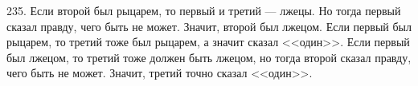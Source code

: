 235. Если второй был рыцарем, то первый и третий --- лжецы. Но тогда первый сказал правду, чего быть не может. Значит, второй был лжецом. Если первый был рыцарем, то третий тоже был рыцарем, а значит сказал <<один>>. Если первый был лжецом, то третий тоже должен быть лжецом, но тогда второй сказал правду, чего быть не может. Значит, третий точно сказал <<один>>.\\
